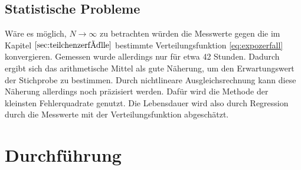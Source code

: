 \documentclass[
  bibliography=totoc,     %
  captions=tableheading,  %
  titlepage=firstiscover, %
]{scrartcl}
\begin{document}
  \subsection{Statistische Probleme}
  Wäre es möglich, $N \to \infty$ zu betrachten würden die Messwerte gegen die
  im Kapitel $\ref{sec:teilchenzerfälle}$
  bestimmte Verteilungsfunktion \eqref{eq:expozerfall} konvergieren. Gemessen
  wurde allerdings nur für etwa 42 Stunden. Dadurch ergibt sich das
  arithmetische Mittel als gute Näherung, um den Erwartungswert der Stichprobe
  zu bestimmen. Durch nichtlineare Ausgleichsrechnung kann diese Näherung
  allerdings noch präzisiert werden. Dafür wird die Methode der kleinsten
  Fehlerquadrate genutzt. Die Lebensdauer wird also durch
  Regression durch die Messwerte mit der Verteilungsfunktion abgeschätzt.
\section{Durchführung}
\end{document}

